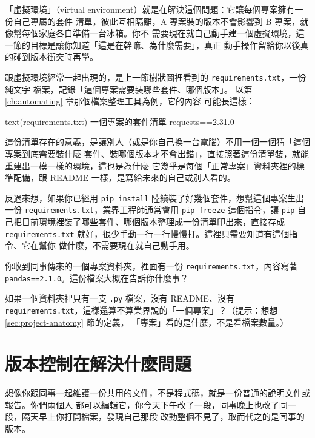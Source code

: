 「虛擬環境」（virtual environment）就是在解決這個問題：它讓每個專案擁有一份自己專屬的套件
清單，彼此互相隔離，A 專案裝的版本不會影響到 B 專案，就像幫每個家庭各自準備一台冰箱。你不
需要現在就自己動手建一個虛擬環境，這一節的目標是讓你知道「這是在幹嘛、為什麼需要」，真正
動手操作留給你以後真的碰到版本衝突時再學。

跟虛擬環境經常一起出現的，是上一節樹狀圖裡看到的 \texttt{requirements.txt}，一份純文字
檔案，記錄「這個專案需要裝哪些套件、哪個版本」。
以第 \ref{ch:automating} 章那個檔案整理工具為例，它的內容
可能長這樣：

\begin{code}{text}{(requirements.txt) 一個專案的套件清單}
requests==2.31.0
\end{code}

這份清單存在的意義，是讓別人（或是你自己換一台電腦）不用一個一個猜「這個專案到底需要裝什麼
套件、裝哪個版本才不會出錯」，直接照著這份清單裝，就能重建出一模一樣的環境，這也是為什麼
它幾乎是每個「正常專案」資料夾裡的標準配備，跟 README 一樣，是寫給未來的自己或別人看的。

反過來想，如果你已經用 \texttt{pip install} 陸續裝了好幾個套件，想幫這個專案生出一份
\texttt{requirements.txt}，業界工程師通常會用 \texttt{pip freeze} 這個指令，讓 \texttt{pip}
自己把目前環境裡裝了哪些套件、哪個版本整理成一份清單印出來，直接存成
\texttt{requirements.txt} 就好，很少手動一行一行慢慢打。這裡只需要知道有這個指令、它在幫你
做什麼，不需要現在就自己動手用。

\begin{drills}[label=drills:project-structure]
\item 你收到同事傳來的一個專案資料夾，裡面有一份 \texttt{requirements.txt}，內容寫著
\texttt{pandas==2.1.0}。這份檔案大概在告訴你什麼事？
\item 如果一個資料夾裡只有一支 \texttt{.py} 檔案，沒有 README、沒有
\texttt{requirements.txt}，這樣還算不算業界說的「一個專案」？（提示：想想 \ref{sec:project-anatomy} 節的定義，
「專案」看的是什麼，不是看檔案數量。）
\end{drills}

\section{版本控制在解決什麼問題}
\label{sec:version-control-why}

想像你跟同事一起維護一份共用的文件，不是程式碼，就是一份普通的說明文件或報告。你們兩個人
都可以編輯它，你今天下午改了一段，同事晚上也改了同一段，隔天早上你打開檔案，發現自己那段
改動整個不見了，取而代之的是同事的版本。

